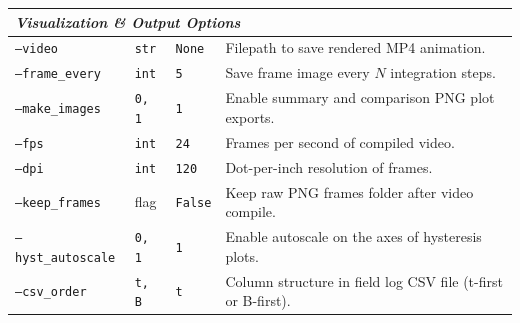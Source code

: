 \documentclass[11pt,a4paper]{article}
\newcommand{\code}[1]{\texttt{#1}}
\begin{document}
\begin{longtable}{lp{3.5cm}lp{6.0cm}}
\multicolumn{4}{l}{\textit{Visualization \& Output Options}} \\
\midrule
\code{--video} & \code{str} & \code{None} & Filepath to save rendered MP4 animation. \\
\code{--frame\_every} & \code{int} & \code{5} & Save frame image every $N$ integration steps. \\
\code{--make\_images} & \code{0, 1} & \code{1} & Enable summary and comparison PNG plot exports. \\
\code{--fps} & \code{int} & \code{24} & Frames per second of compiled video. \\
\code{--dpi} & \code{int} & \code{120} & Dot-per-inch resolution of frames. \\
\code{--keep\_frames} & flag & \code{False} & Keep raw PNG frames folder after video compile. \\
\code{--hyst\_autoscale} & \code{0, 1} & \code{1} & Enable autoscale on the axes of hysteresis plots. \\
\code{--csv\_order} & \code{t, B} & \code{t} & Column structure in field log CSV file (t-first or B-first). \\

\end{longtable}
\end{document}
